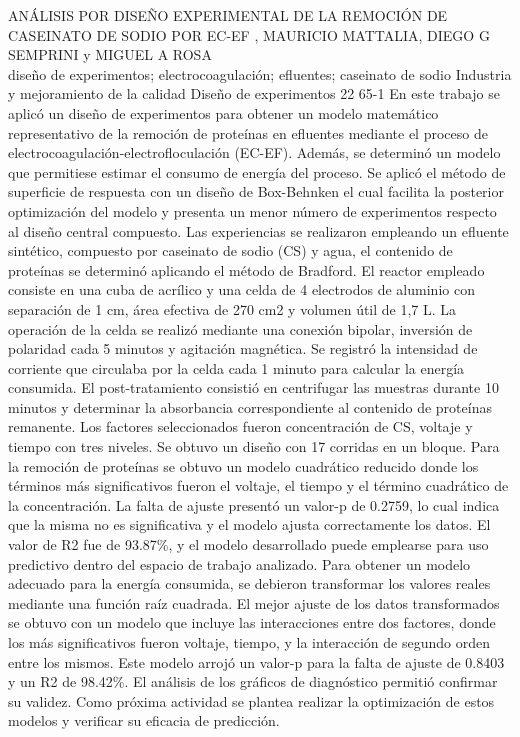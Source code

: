 \A
{ANÁLISIS POR DISEÑO EXPERIMENTAL DE LA REMOCIÓN DE CASEINATO DE SODIO POR EC-EF}
{, MAURICIO MATTALIA, DIEGO G SEMPRINI y MIGUEL A ROSA}
{
\\}
{diseño de experimentos; electrocoagulación; efluentes; caseinato de sodio} 
 {Industria y mejoramiento de la calidad} 
 {Diseño de experimentos} 
 {22} 
 {65-1}
{En este trabajo se aplicó un diseño de experimentos para obtener un modelo matemático representativo de la remoción de proteínas en efluentes mediante el proceso de electrocoagulación-electrofloculación (EC-EF). Además, se determinó un modelo que permitiese estimar el consumo de energía del proceso. Se aplicó el método de superficie de respuesta con un diseño de Box-Behnken el cual facilita la posterior optimización del modelo y presenta un menor número de experimentos respecto al diseño central compuesto. Las experiencias se realizaron empleando un efluente sintético, compuesto por caseinato de sodio (CS) y agua, el contenido de proteínas se determinó aplicando el método de Bradford. El reactor empleado consiste en una cuba de acrílico y una celda de 4 electrodos de aluminio con separación de 1 cm, área efectiva de 270 cm2 y volumen útil de 1,7 L. La operación de la celda se realizó mediante una conexión bipolar, inversión de polaridad cada 5 minutos y agitación magnética. Se registró la intensidad de corriente que circulaba por la celda cada 1 minuto para calcular la energía consumida. El post-tratamiento consistió en centrifugar las muestras durante 10 minutos y determinar la absorbancia correspondiente al contenido de proteínas remanente. Los factores seleccionados fueron concentración de CS, voltaje y tiempo con tres niveles. Se obtuvo un diseño con 17 corridas en un bloque. Para la remoción de proteínas se obtuvo un modelo cuadrático reducido donde los términos más significativos fueron el voltaje, el tiempo y el término cuadrático de la concentración. La falta de ajuste presentó un valor-p de 0.2759, lo cual indica que la misma no es significativa y el modelo ajusta correctamente los datos. El valor de R2 fue de 93.87\%, y el modelo desarrollado puede emplearse para uso predictivo dentro del espacio de trabajo analizado. Para obtener un modelo adecuado para la energía consumida, se debieron transformar los valores reales mediante una función raíz cuadrada. El mejor ajuste de los datos transformados se obtuvo con un modelo que incluye las interacciones entre dos factores, donde los más significativos fueron voltaje, tiempo, y la interacción de segundo orden entre los mismos. Este modelo arrojó un valor-p para la falta de ajuste de 0.8403 y un R2 de 98.42\%. El análisis de los gráficos de diagnóstico permitió confirmar su validez. Como próxima actividad se plantea realizar la optimización de estos modelos y verificar su eficacia de predicción.}
